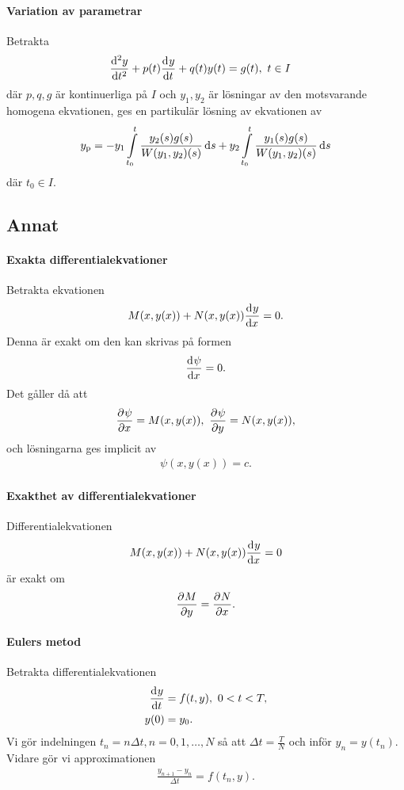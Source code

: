 \paragraph{Variation av parametrar}
Betrakta
\begin{align*}
	\deval[2]{y}{t}{t} + p(t)\deval{y}{t}{t} + q(t)y(t) &= g(t),\ t\in I
\end{align*}
där $p, q, g$ är kontinuerliga på $I$ och $y_{1}, y_{2}$ är lösningar av den motsvarande homogena ekvationen, ges en partikulär lösning av ekvationen av
\begin{align*}
	y_{\text{p}} = -y_{1}\int\limits_{t_{0}}^{t}\frac{y_{2}(s)g(s)}{W(y_{1}, y_{2})(s)}\dd{s} + y_{2}\int\limits_{t_{0}}^{t}\frac{y_{1}(s)g(s)}{W(y_{1}, y_{2})(s)}\dd{s}
\end{align*}
där $t_{0}\in I$.

\subsection{Annat}

\paragraph{Exakta differentialekvationer}
Betrakta ekvationen
\begin{align*}
	M(x, y(x)) + N(x, y(x))\dv[]{y}{x} (x) = 0.
\end{align*}
Denna är exakt om den kan skrivas på formen
\begin{align*}
	\dv[]{\psi}{x} (x, y(x)) = 0.
\end{align*}
Det gåller då att
\begin{align*}
	\pdv[]{\psi}{x} (x, y(x)) = M(x, y(x)),\ \pdv[]{\psi}{y} (x, y(x)) = N(x, y(x)),
\end{align*}
och lösningarna ges implicit av
\begin{align*}
	\psi(x, y(x)) = c.
\end{align*}

\paragraph{Exakthet av differentialekvationer}
Differentialekvationen
\begin{align*}
	M(x, y(x)) + N(x, y(x))\dv[]{y}{x} (x) = 0
\end{align*}
är exakt om
\begin{align*}
	\pdv[]{M}{y} (x, y(x)) = \pdv[]{N}{x} (x, y(x)).
\end{align*}

\paragraph{Eulers metod}
Betrakta differentialekvationen
\begin{align*}
	\dv[]{y}{t} (t) &= f(t, y),\ 0 < t < T, \\
	y(0)             &= y_0.
\end{align*}
Vi gör indelningen $t_n = n\Delta t, n = 0, 1, \dots, N$ så att $\Delta t = \frac{T}{N}$ och inför $y_n = y(t_n)$. Vidare gör vi approximationen
\begin{align*}
	\frac{y_{n + 1} - y_{n}}{\Delta t} = f(t_n, y).
\end{align*}